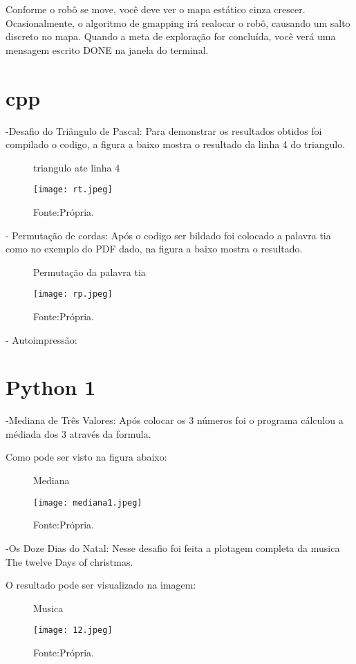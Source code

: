 Conforme o robô se move, você deve ver o mapa estático cinza crescer. Ocasionalmente, o algoritmo de gmapping irá realocar o robô, causando um salto discreto no mapa. Quando a meta de exploração for concluída, você verá uma mensagem escrito DONE na janela do terminal.
\section{cpp}
-Desafio do Triângulo de Pascal:
Para demonstrar os resultados obtidos foi compilado o codigo, a figura a baixo mostra o resultado da linha 4 do triangulo.
\begin{figure} [h!]	
    \centering
    \caption{triangulo ate linha 4}
    \texttt{[image: rt.jpeg]}
    \caption*{Fonte:Própria.}
    \label{fig:triangulodepascal}
\end{figure}

- Permutação de cordas:
Após o codigo ser bildado foi colocado a palavra tia como no exemplo do PDF dado, na figura a baixo mostra o resultado.
\begin{figure} [h!]	
    \centering
    \caption{Permutação da palavra tia}
    \texttt{[image: rp.jpeg]}
    \caption*{Fonte:Própria.}
    \label{fig:permutacao}
\end{figure}
- Autoimpressão:

\section{Python 1}
-Mediana de Três Valores:
Após colocar os 3 números foi o programa cálculou a médiada dos 3 através da formula.

Como pode ser visto na figura abaixo:
\begin{figure} [h!]	
    \centering
    \caption{Mediana}
    \texttt{[image: mediana1.jpeg]}
    \caption*{Fonte:Própria.}
    \label{fig:med}
\end{figure}

-Os Doze Dias do Natal:
Nesse desafio foi feita a plotagem completa da musica The twelve Days of christmas.

O resultado pode ser visualizado na imagem:
\begin{figure} [h!]	
    \centering
    \caption{Musica}
    \texttt{[image: 12.jpeg]}
    \caption*{Fonte:Própria.}
    \label{fig:musica}
\end{figure}

